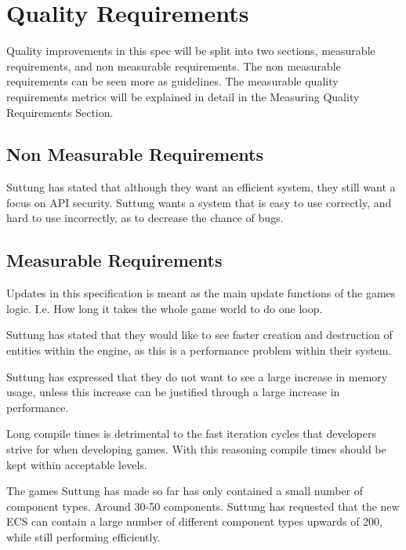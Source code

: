 \section{Quality Requirements}
Quality improvements in this spec will be split into two sections,
measurable requirements, and non measurable requirements.
The non measurable requirements can be seen more as guidelines. 
The measurable quality requirements metrics will be explained in detail in the Measuring Quality Requirements Section.

\subsection{Non Measurable Requirements}
Suttung has stated that although they want an efficient system, they still want a focus on API security. 
Suttung wants a system that is easy to use correctly, and hard to use incorrectly, as to decrease the chance of bugs.

\subsection{Measurable Requirements}
Updates in this specification is meant as the main update functions of the games logic.
I.e. How long it takes the whole game world to do one loop.

Suttung has stated that they would like to see faster creation and destruction of entities within the engine, 
as this is a performance problem within their system.

Suttung has expressed that they do not want to see a large increase in memory usage, 
unless this increase can be justified through a large increase in performance.

Long compile times is detrimental to the fast iteration cycles that developers strive for when developing games.
With this reasoning compile times should be kept within acceptable levels.

The games Suttung has made so far has only contained a small number of component types. Around 30-50 components.
Suttung has requested that the new ECS can contain a large number of different component types upwards of 200, 
while still performing efficiently. 
